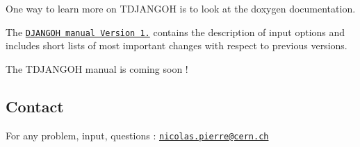 One way to learn more on T\+D\+J\+A\+N\+G\+OH is to look at the doxygen documentation.

The \href{http://wwwthep.physik.uni-mainz.de/~hspiesb/djangoh/djangoh_m.4.6.6.ps.gz}{\tt D\+J\+A\+N\+G\+OH manual Version 1.} contains the description of input options and includes short lists of most important changes with respect to previous versions.

The T\+D\+J\+A\+N\+G\+OH manual is coming soon !

\subsection*{Contact}

For any problem, input, questions \+: \href{mailto:nicolas.pierre@cern.ch}{\tt nicolas.\+pierre@cern.\+ch} 